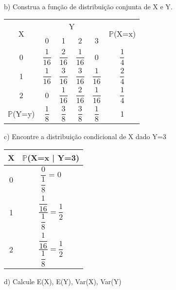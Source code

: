 \documentclass[12pt,a4paper,draft]{article}
\begin{document}
	\vspace{1cm}\\
	b) Construa a função de distribuição conjunta de X e Y.\\
	\vspace{1cm}
	\begin{center}
		\begin{tabular}{cccccc} \midrule
			\multirow{2}{*}{X} & \multicolumn{4}{c}{Y} & \multirow{2}{*}{$\mathbb{P}$(X=x)}\\ \cmidrule{2-5}
			& 0 & 1 & 2 & 3 & \\ \midrule
			0 & $\dfrac{1}{16}$ & $\dfrac{2}{16}$ & $\dfrac{1}{16}$ & 0 & $\dfrac{1}{4}$\\ \midrule
			1 & $\dfrac{1}{16}$ & $\dfrac{3}{16}$ & $\dfrac{3}{16}$ & $\dfrac{1}{16}$ & $\dfrac{2}{4}$\\ \midrule
			2 & 0 & $\dfrac{1}{16}$ & $\dfrac{2}{16}$ & $\dfrac{1}{16}$ & $\dfrac{1}{4}$\\ \midrule
			$\mathbb{P}$(Y=y) & $\dfrac{1}{8}$ & $\dfrac{3}{8}$ & $\dfrac{3}{8}$ & $\dfrac{1}{8}$ & 1\\ \midrule
		\end{tabular}
	\end{center}
	\vspace{1cm}
	c) Encontre a distribuição condicional de X dado Y=3\\
	\vspace{1cm}
	\begin{center}
		\begin{tabular}{cc}
			X & $\mathbb{P}$(X=x | Y=3)\\ \midrule
			0 & $\dfrac{0}{\dfrac{1}{8}}$ = 0\\ \midrule
			1 & $\dfrac{\dfrac{1}{16}}{\dfrac{1}{8}} = \dfrac{1}{2}$\\ \midrule
			2 & $\dfrac{\dfrac{1}{16}}{\dfrac{1}{8}} = \dfrac{1}{2}$\\ \midrule
		\end{tabular}
	\end{center}
	\vspace{1cm}
	d) Calcule E(X), E(Y), Var(X), Var(Y)\\
	\vspace{1cm}\\
\end{document}
